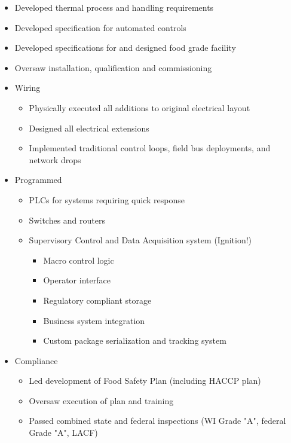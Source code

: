 \documentclass[10pt,a4paper]{article} %
\begin{document}
{{{\begin{itemize}
\item Developed thermal process and handling requirements
\item Developed specification for automated controls
\item Developed specifications for and designed food grade facility

\item Oversaw installation, qualification and commissioning
\item Wiring
\begin{itemize}

\item Physically executed all additions to original electrical layout
\item Designed all electrical extensions
\item Implemented traditional control loops, field bus deployments, and network drops
\end{itemize}

\item Programmed
\begin{itemize}

\item PLCs for systems requiring quick response
\item Switches and routers
\item Supervisory Control and Data Acquisition system (Ignition!) 
\begin{itemize}
\item Macro control logic
\item Operator interface
\item Regulatory compliant storage
\item Business system integration
\item Custom package serialization and tracking system
\end{itemize}
\end{itemize}

\item Compliance
\begin{itemize}
\item Led development of Food Safety Plan (including HACCP plan)
\item Oversaw execution of plan and training
\item Passed combined state and federal inspections (WI Grade "A", federal Grade "A", LACF) 
\end{itemize}

\end{itemize}
}
}
}
\end{document}
